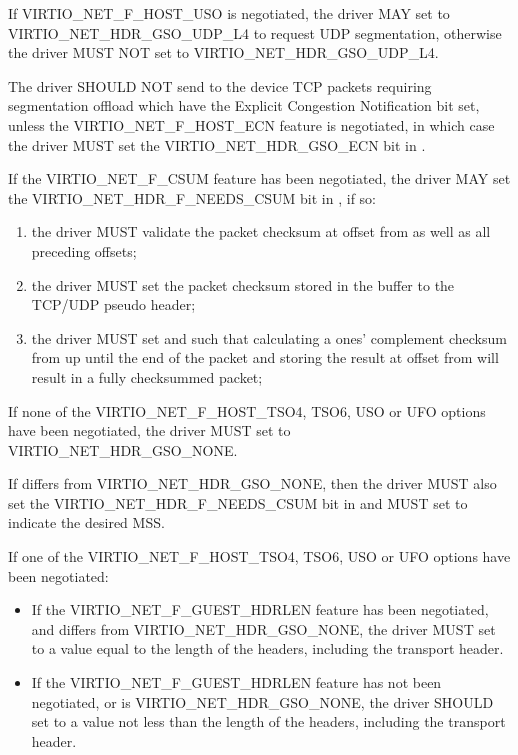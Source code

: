 If VIRTIO_NET_F_HOST_USO is negotiated, the driver MAY set
 to VIRTIO_NET_HDR_GSO_UDP_L4 to request UDP
segmentation, otherwise the driver MUST NOT set
 to VIRTIO_NET_HDR_GSO_UDP_L4.

The driver SHOULD NOT send to the device TCP packets requiring segmentation offload
which have the Explicit Congestion Notification bit set, unless the
VIRTIO_NET_F_HOST_ECN feature is negotiated, in which case the
driver MUST set the VIRTIO_NET_HDR_GSO_ECN bit in
.

If the VIRTIO_NET_F_CSUM feature has been negotiated, the
driver MAY set the VIRTIO_NET_HDR_F_NEEDS_CSUM bit in
, if so:
\begin{enumerate}
\item the driver MUST validate the packet checksum at
	offset  from  as well as all
	preceding offsets;
\item the driver MUST set the packet checksum stored in the
	buffer to the TCP/UDP pseudo header;
\item the driver MUST set  and
	 such that calculating a ones'
	complement checksum from  up until the end of
	the packet and storing the result at offset 
	from   will result in a fully checksummed
	packet;
\end{enumerate}

If none of the VIRTIO_NET_F_HOST_TSO4, TSO6, USO or UFO options have
been negotiated, the driver MUST set  to
VIRTIO_NET_HDR_GSO_NONE.

If  differs from VIRTIO_NET_HDR_GSO_NONE, then
the driver MUST also set the VIRTIO_NET_HDR_F_NEEDS_CSUM bit in
 and MUST set  to indicate the
desired MSS.

If one of the VIRTIO_NET_F_HOST_TSO4, TSO6, USO or UFO options have
been negotiated:
\begin{itemize}
\item If the VIRTIO_NET_F_GUEST_HDRLEN feature has been negotiated,
	and  differs from VIRTIO_NET_HDR_GSO_NONE,
	the driver MUST set  to a value equal to the length
	of the headers, including the transport header.

\item If the VIRTIO_NET_F_GUEST_HDRLEN feature has not been negotiated,
	or  is VIRTIO_NET_HDR_GSO_NONE,
	the driver SHOULD set  to a value
	not less than the length of the headers, including the transport
	header.
\end{itemize}

